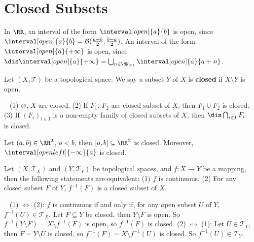 \section{Closed Subsets}
\begin{exampleenv}
    In $\RR$, an interval of the form $\interval[open]{a}{b}$ is open, since $\interval[open]{a}{b}=\mathcal{B}(\frac{a+b}{2},\frac{b-a}{2})$. An interval of the form $\interval[open]{a}{+\infty}$ is open, since $\dis \interval[open]{a}{+\infty}=\bigcup_{n\in\NN_{\ge 1}}\interval[open]{a}{a+n}$.
\end{exampleenv}
\begin{definitionenv}
    Let $(X,\mathscr{T})$ be a topological space. We say a subset $Y$ of $X$ is \textbf{closed} if $X\setminus Y$ is open.
\end{definitionenv}
\begin{remark}
    \ \newline
    (1) $\varnothing$, $X$ are closed.
    \newline
    (2) If $F_1$, $F_2$ are closed subset of $X$, then $F_1\cup F_2$ is closed.
    \newline
    (3) If $(F_i)_{i\in I}$ is a non-empty family of closed subsets of $X$, then $\dis \bigcap_{i\in I}F_i$ is closed.
\end{remark}
\begin{exampleenv}
    Let $(a,b)\in \RR^2$, $a<b$, then $[a,b]\subseteq \RR^2$ is closed. Moreover, $\interval[open left]{-\infty}{a}$ is closed.
\end{exampleenv}
\begin{propositionenv}
    Let $(X,\mathscr{T}_X)$ and $(Y,\mathscr{T}_Y)$ be topological spaces, and $f:X\longrightarrow Y$ be a mapping, then the following statements are equivalent:
    \newline
    (1) $f$ is continuous.
    \newline
    (2) For any closed subset $F$ of $Y$, $f^{-1}(F)$ is a closed subset of $X$.
\end{propositionenv}
\begin{proofenv}
    \ \newline
    (1) $\Leftrightarrow$ (2): $f$ is continuous if and only if, for any open subset $U$ of $Y$, $f^{-1}(U)\in \mathscr{T}_X$. Let $F\subseteq Y$ be closed, then $Y\setminus F$ is open. So
    $f^{-1}(Y\setminus F)=X\setminus f^{-1}(F)$ is open, so $f^{-1}(F)$ is closed.
    \newline
    (2) $\Leftrightarrow$ (1): Let $U\in \mathscr{T}_Y$, then $F=Y\setminus U$ is closed, so $f^{-1}(F)=X\setminus f^{-1}(U)$ is closed. So $f^{-1}(U)\in \mathscr{T}_Y$.
\end{proofenv}
